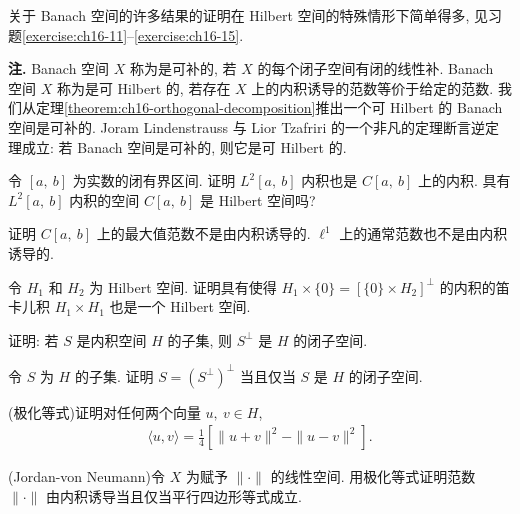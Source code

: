 \documentclass[../../main.tex]{subfiles}
\begin{document}
关于 Banach 空间的许多结果的证明在 Hilbert 空间的特殊情形下简单得多, 见习题\cref{exercise:ch16-11}--\cref{exercise:ch16-15}.

\medskip\par\noindent\textbf{注. }Banach 空间 $X$ 称为是可补的, 若 $X$ 的每个闭子空间有闭的线性补. Banach 空间 $X$ 称为是可 Hilbert 的, 若存在 $X$ 上的内积诱导的范数等价于给定的范数. 我们从定理\cref{theorem:ch16-orthogonal-decomposition}推出一个可 Hilbert 的 Banach 空间是可补的. Joram Lindenstrauss 与 Lior Tzafriri 的一个非凡的定理断言逆定理成立: 若 Banach 空间是可补的, 则它是可 Hilbert 的.

\begin{exercise}\label{exercise:ch16-01}
令 $[a,\ b]$ 为实数的闭有界区间. 证明 $L^{2}[a,\ b]$ 内积也是 $C[a,\ b]$ 上的内积. 具有 $L^{2}[a,\ b]$ 内积的空间 $C[a,\ b]$ 是 Hilbert 空间吗?
\end{exercise}

\begin{exercise}\label{exercise:ch16-02}
证明 $C[a,\ b]$ 上的最大值范数不是由内积诱导的. $\ell^{1}$ 上的通常范数也不是由内积诱导的.
\end{exercise}

\begin{exercise}\label{exercise:ch16-03}
令 $H_{1}$ 和 $H_{2}$ 为 Hilbert 空间. 证明具有使得 $H_{1}\times\{0\}=[\{0\}\times H_{2}]^{\perp}$ 的内积的笛卡儿积 $H_{1}\times H_{1}$ 也是一个 Hilbert 空间.
\end{exercise}

\begin{exercise}\label{exercise:ch16-04}
证明: 若 $S$ 是内积空间 $H$ 的子集, 则 $S^{\perp}$ 是 $H$ 的闭子空间.
\end{exercise}

\begin{exercise}\label{exercise:ch16-05}
令 $S$ 为 $H$ 的子集. 证明 $S=(S^{\perp})^{\perp}$ 当且仅当 $S$ 是 $H$ 的闭子空间.
\end{exercise}

\begin{exercise}\label{exercise:ch16-06}
(极化等式)证明对任何两个向量 $u,\ v\in H$,
\begin{align*}
\langle u,v\rangle=\frac{1}{4}\left[\|u+v\|^{2}-\|u-v\|^{2}\right].
\end{align*}
\end{exercise}

\begin{exercise}\label{exercise:ch16-07}
(Jordan-von Neumann)令 $X$ 为赋予 $\|\cdot\|$ 的线性空间. 用极化等式证明范数 $\|\cdot\|$ 由内积诱导当且仅当平行四边形等式成立.
\end{exercise}
\end{document}
